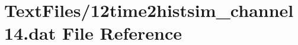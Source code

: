 \hypertarget{12time2histsim__channel14_8dat}{}\section{Text\+Files/12time2histsim\+\_\+channel14.dat File Reference}
\label{12time2histsim__channel14_8dat}
